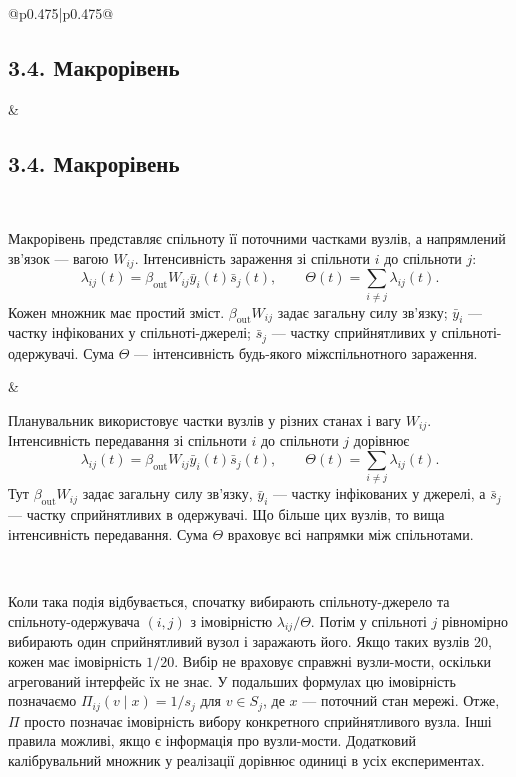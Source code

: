 ﻿\documentclass[11pt]{article}
\newcommand{\ibar}{\bar{y}}
\newcommand{\sbar}{\bar{s}}
\begin{document}
\begin{longtable}{@{}p{0.475\textwidth}|p{0.475\textwidth}@{}}
\begin{minipage}[t]{\linewidth}
\subsection*{3.4. Макрорівень}
\end{minipage} &
\begin{minipage}[t]{\linewidth}
\subsection*{3.4. Макрорівень}
\end{minipage} \\[5mm]
\begin{minipage}[t]{\linewidth}
Макрорівень представляє спільноту її поточними частками вузлів, а напрямлений зв'язок --- вагою $W_{ij}$. Інтенсивність зараження зі спільноти $i$ до спільноти $j$:
\begin{equation*}\lambda_{ij}(t)=\beta_{\mathrm{out}}W_{ij}\ibar_i(t)\sbar_j(t),
\qquad \Theta(t)=\sum_{i\neq j}\lambda_{ij}(t).\tag{4}
\end{equation*}
Кожен множник має простий зміст. $\beta_{\mathrm{out}}W_{ij}$ задає загальну силу зв'язку; $\ibar_i$ --- частку інфікованих у спільноті-джерелі; $\sbar_j$ --- частку сприйнятливих у спільноті-одержувачі. Сума $\Theta$ --- інтенсивність будь-якого міжспільнотного зараження.
\end{minipage} &
\begin{minipage}[t]{\linewidth}
Планувальник використовує частки вузлів у різних станах і вагу $W_{ij}$. Інтенсивність передавання зі спільноти $i$ до спільноти $j$ дорівнює
\begin{equation*}\lambda_{ij}(t)=\beta_{\mathrm{out}}W_{ij}\ibar_i(t)\sbar_j(t),
\qquad \Theta(t)=\sum_{i\neq j}\lambda_{ij}(t).\tag{4}
\end{equation*}
Тут $\beta_{\mathrm{out}}W_{ij}$ задає загальну силу зв'язку, $\ibar_i$ --- частку інфікованих у джерелі, а $\sbar_j$ --- частку сприйнятливих в одержувачі. Що більше цих вузлів, то вища інтенсивність передавання. Сума $\Theta$ враховує всі напрямки між спільнотами.
\end{minipage} \\[5mm]
\begin{minipage}[t]{\linewidth}
Коли така подія відбувається, спочатку вибирають спільноту-джерело та спільноту-одержувача $(i,j)$ з імовірністю $\lambda_{ij}/\Theta$. Потім у спільноті $j$ рівномірно вибирають один сприйнятливий вузол і заражають його. Якщо таких вузлів 20, кожен має імовірність $1/20$. Вибір не враховує справжні вузли-мости, оскільки агрегований інтерфейс їх не знає. У подальших формулах цю імовірність позначаємо $\Pi_{ij}(v\mid x)=1/s_j$ для $v\in S_j$, де $x$ --- поточний стан мережі. Отже, $\Pi$ просто позначає імовірність вибору конкретного сприйнятливого вузла. Інші правила можливі, якщо є інформація про вузли-мости. Додатковий калібрувальний множник у реалізації дорівнює одиниці в усіх експериментах.

\end{minipage}
\end{longtable}
\end{document}
